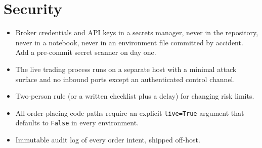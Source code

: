 \section{Security}

\begin{itemize}
\item Broker credentials and API keys in a secrets manager, never in the
repository, never in a notebook, never in an environment file committed by
accident. Add a pre-commit secret scanner on day one.
\item The live trading process runs on a separate host with a minimal
attack surface and no inbound ports except an authenticated control channel.
\item Two-person rule (or a written checklist plus a delay) for changing risk
limits.
\item All order-placing code paths require an explicit \texttt{live=True}
argument that defaults to \texttt{False} in every environment.
\item Immutable audit log of every order intent, shipped off-host.
\end{itemize}

